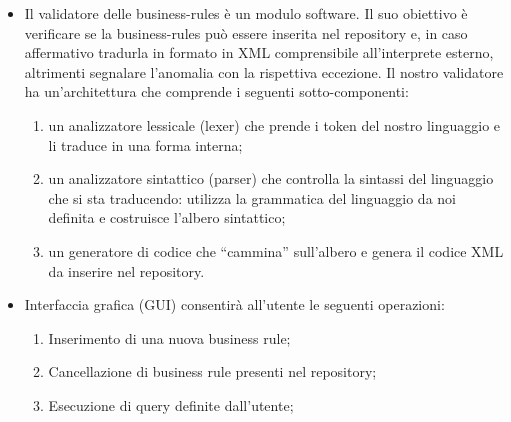 \documentclass[11pt,titlepage,a4paper]{report}
\begin{document}
\begin{itemize}
\item Il validatore delle business-rules \`e un modulo software. Il suo obiettivo \`e verificare se la business-rules pu\`o essere inserita nel repository e, in caso affermativo tradurla in formato in XML comprensibile all'interprete esterno, altrimenti segnalare l'anomalia con la rispettiva eccezione. Il nostro validatore ha un'architettura che comprende i seguenti sotto-componenti:
\begin{enumerate}
\item un analizzatore lessicale (lexer) che prende i token del nostro linguaggio e li traduce in una forma interna;

\item un analizzatore sintattico (parser) che controlla la sintassi del linguaggio che si sta traducendo: utilizza la grammatica del linguaggio da noi definita e costruisce l'albero sintattico;
\item un generatore di codice che ``cammina'' sull'albero e genera il codice XML da inserire nel repository.
\end{enumerate}

\item Interfaccia grafica (GUI) consentir\`a all'utente le seguenti operazioni:
\begin{enumerate}
\item Inserimento di una nuova business rule;
\item Cancellazione di business rule presenti nel repository;
\item Esecuzione di query definite dall'utente;
\end{enumerate}

\end{itemize}
\end{document}
